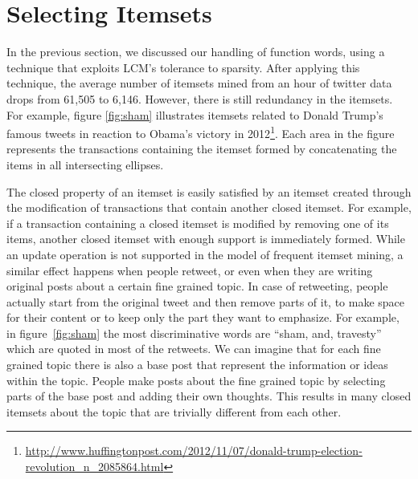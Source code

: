 \documentclass{sig-alternate}
\begin{document}
\section{Selecting Itemsets} %
\label{sec:strong}



In the previous section, we discussed our handling of function words,
using a technique that exploits LCM's tolerance to sparsity.
After applying this technique, the average number of itemsets mined from an
hour of twitter data drops from 61,505 to 6,146.
However, there is still redundancy in the itemsets.
For example, figure \ref{fig:sham} illustrates  itemsets related to Donald
Trump's famous tweets in reaction to Obama's victory in
2012\footnote{\scriptsize \url{http://www.huffingtonpost.com/2012/11/07/donald-trump-election-revolution_n_2085864.html}}.  
Each area in the figure represents the transactions containing the itemset
formed by concatenating the items in all intersecting ellipses. 

The closed property of an itemset is easily satisfied by an itemset
created through the modification of 
transactions that contain another closed itemset.
For example, if a transaction containing a closed itemset
is modified by removing one of its items,
another closed itemset with enough support is immediately formed.
While an update operation is not supported in the model of frequent itemset mining, 
a similar effect happens when people retweet, 
or even when they are writing original posts about 
a certain fine grained topic.
In case of retweeting, people actually start from the original tweet and 
then remove parts of it,
to make space for their content
or to keep only the part they want to emphasize. 
For example, in figure~\ref{fig:sham}  the most discriminative words are ``sham, and, travesty''
which are quoted 
in most of the retweets.
We can imagine that for each fine grained topic there is also a base post
that represent the information or ideas within the topic. 
People make posts about the fine grained topic 
by selecting parts of the base post
and adding their own thoughts.
This results in many closed itemsets 
about the topic that
are trivially different from each other.
\end{document}
